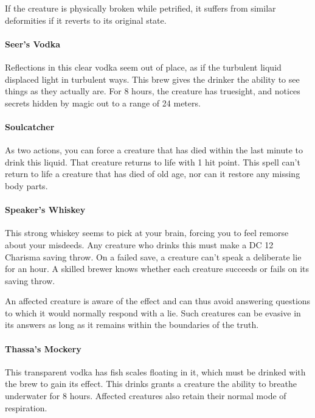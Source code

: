         If the creature is physically broken while petrified, it suffers from similar deformities if it reverts to its original state.
    \paragraph{Seer's Vodka} %
        Reflections in this clear vodka seem out of place, as if the turbulent liquid displaced light in turbulent ways.
        This brew gives the drinker the ability to see things as they actually are.
        For 8 hours, the creature has truesight, and notices secrets hidden by magic out to a range of 24 meters.
    \paragraph{Soulcatcher} %
        As two actions, you can force a creature that has died within the last minute to drink this liquid.
        That creature returns to life with 1 hit point.
        This spell can't return to life a creature that has died of old age, nor can it restore any missing body parts.
    \paragraph{Speaker's Whiskey} %
        This strong whiskey seems to pick at your brain, forcing you to feel remorse about your misdeeds.
        Any creature who drinks this must make a DC 12 Charisma saving throw.
        On a failed save, a creature can't speak a deliberate lie for an hour.
        A skilled brewer knows whether each creature succeeds or fails on its saving throw.

        An affected creature is aware of the effect and can thus avoid answering questions to which it would normally respond with a lie.
        Such creatures can be evasive in its answers as long as it remains within the boundaries of the truth.
    \paragraph{Thassa's Mockery} %
        This transparent vodka has fish scales floating in it, which must be drinked with the brew to gain its effect.
        This drinks grants a creature the ability to breathe underwater for 8 hours.
        Affected creatures also retain their normal mode of respiration.
